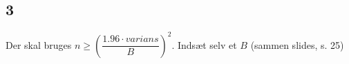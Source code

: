 \documentclass{article}
\begin{document}
\subsection*{3} %
Der skal bruges $n \geq \left( \dfrac{1.96 \cdot varians}{B} \right) ^2$. 
Indsæt selv et $B$ (sammen slides, s. 25)








\end{document}
